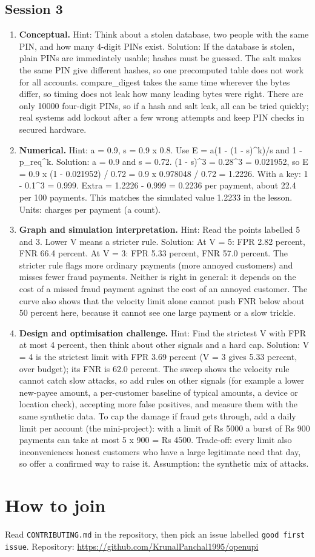 \documentclass[11pt,a4paper]{article}
\begin{document}
\subsection*{Session 3}
\begin{enumerate}[nosep]
\item \textbf{Conceptual.} Hint: Think about a stolen database, two people with the same PIN, and how many 4-digit PINs exist. Solution: If the database is stolen, plain PINs are immediately usable; hashes must be guessed. The salt makes the same PIN give different hashes, so one precomputed table does not work for all accounts. compare\_digest takes the same time wherever the bytes differ, so timing does not leak how many leading bytes were right. There are only 10000 four-digit PINs, so if a hash and salt leak, all can be tried quickly; real systems add lockout after a few wrong attempts and keep PIN checks in secured hardware.
\item \textbf{Numerical.} Hint: a = 0.9, s = 0.9 x 0.8. Use E = a(1 - (1 - s)\textasciicircum{}k)/s and 1 - p\_req\textasciicircum{}k. Solution: a = 0.9 and s = 0.72. (1 - s)\textasciicircum{}3 = 0.28\textasciicircum{}3 = 0.021952, so E = 0.9 x (1 - 0.021952) / 0.72 = 0.9 x 0.978048 / 0.72 = 1.2226. With a key: 1 - 0.1\textasciicircum{}3 = 0.999. Extra = 1.2226 - 0.999 = 0.2236 per payment, about 22.4 per 100 payments. This matches the simulated value 1.2233 in the lesson. Units: charges per payment (a count).
\item \textbf{Graph and simulation interpretation.} Hint: Read the points labelled 5 and 3. Lower V means a stricter rule. Solution: At V = 5: FPR 2.82 percent, FNR 66.4 percent. At V = 3: FPR 5.33 percent, FNR 57.0 percent. The stricter rule flags more ordinary payments (more annoyed customers) and misses fewer fraud payments. Neither is right in general: it depends on the cost of a missed fraud payment against the cost of an annoyed customer. The curve also shows that the velocity limit alone cannot push FNR below about 50 percent here, because it cannot see one large payment or a slow trickle.
\item \textbf{Design and optimisation challenge.} Hint: Find the strictest V with FPR at most 4 percent, then think about other signals and a hard cap. Solution: V = 4 is the strictest limit with FPR 3.69 percent (V = 3 gives 5.33 percent, over budget); its FNR is 62.0 percent. The sweep shows the velocity rule cannot catch slow attacks, so add rules on other signals (for example a lower new-payee amount, a per-customer baseline of typical amounts, a device or location check), accepting more false positives, and measure them with the same synthetic data. To cap the damage if fraud gets through, add a daily limit per account (the mini-project): with a limit of Rs 5000 a burst of Rs 900 payments can take at most 5 x 900 = Rs 4500. Trade-off: every limit also inconveniences honest customers who have a large legitimate need that day, so offer a confirmed way to raise it. Assumption: the synthetic mix of attacks.
\end{enumerate}

\section{How to join}
Read \texttt{CONTRIBUTING.md} in the repository, then pick an issue labelled \texttt{good first issue}. Repository: \url{https://github.com/KrunalPanchal1995/openupi}
\end{document}
